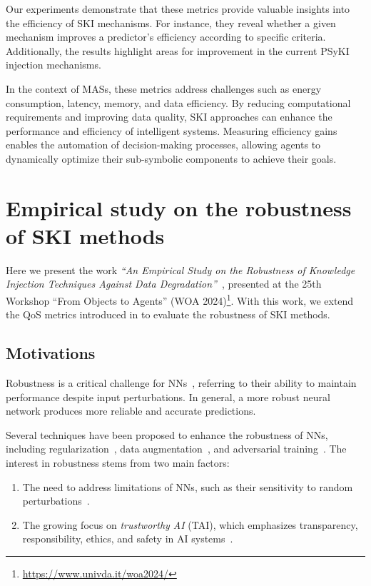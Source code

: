 %
Our experiments demonstrate that these metrics provide valuable insights into the efficiency of \gls{SKI} mechanisms.
%
For instance, they reveal whether a given mechanism improves a predictor's efficiency according to specific criteria.
%
Additionally, the results highlight areas for improvement in the current \gls{PSyKI} injection mechanisms.

%
In the context of \glspl{MAS}, these metrics address challenges such as energy consumption, latency, memory, and data efficiency.
%
By reducing computational requirements and improving data quality, \gls{SKI} approaches can enhance the performance and efficiency of intelligent systems.
%
Measuring efficiency gains enables the automation of decision-making processes, allowing agents to dynamically optimize their sub-symbolic components to achieve their goals.


\section[Empirical study on the robustness of SKI methods]{Empirical study on the robustness of \Gls{SKI} methods}\label{sec:empirical-study-on-the-robustness-of-ski-methods}
%
Here we present the work \emph{``An Empirical Study on the Robustness of Knowledge Injection Techniques Against Data Degradation''}~\cite{DBLP:conf/woa/RafanelliMACO24}, presented at the 25th Workshop ``From Objects to Agents'' (WOA 2024)\footnote{\url{https://www.univda.it/woa2024/}}.
%
With this work, we extend the \gls{QoS} metrics introduced in  to evaluate the robustness of \gls{SKI} methods.


\subsection{Motivations}\label{subsec:empirical-study-on-the-robustness-of-ski-methods-motivations}
%
Robustness is a critical challenge for \glspl{NN}~\cite{placeholder}, referring to their ability to maintain performance despite input perturbations.
%
In general, a more robust neural network produces more reliable and accurate predictions.

%
Several techniques have been proposed to enhance the robustness of \glspl{NN}, including regularization~\cite{placeholder}, data augmentation~\cite{placeholder}, and adversarial training~\cite{placeholder}.
%
The interest in robustness stems from two main factors:
%
\begin{enumerate}
    \item The need to address limitations of \glspl{NN}, such as their sensitivity to random perturbations~\cite{placeholder}.
    \item The growing focus on \emph{trustworthy AI} (\gls{TAI}), which emphasizes transparency, responsibility, ethics, and safety in \gls{AI} systems~\cite{placeholder}.
\end{enumerate}

